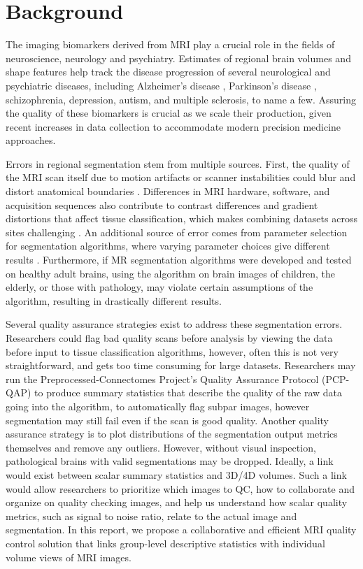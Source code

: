 \section{Background}


The imaging biomarkers derived from MRI play a crucial role in the fields of neuroscience, neurology and psychiatry. Estimates of regional brain volumes and shape features help track the disease progression of several neurological and psychiatric diseases, including Alzheimer's disease \cite{Vemuri_2010}, Parkinson's disease \cite{Silvia_Mangia_2013}, schizophrenia\cite{shenton2001review}, depression\cite{meisenzahl2011structural}, autism\cite{brambilla2003brain}, and multiple sclerosis\cite{Filippi_1995}, to name a few. Assuring the quality of these biomarkers is crucial as we scale their production, given recent increases in data collection to accommodate modern precision medicine approaches. 

Errors in regional segmentation stem from multiple sources. First, the quality of the MRI scan itself due to motion artifacts or scanner instabilities could blur and distort anatomical boundaries \cite{Blumenthal_2002}. Differences in MRI hardware, software, and acquisition sequences also contribute to contrast differences and gradient distortions that affect tissue classification, which makes combining datasets across sites challenging \cite{keshavan2016power}. An additional source of error comes from parameter selection for segmentation algorithms, where varying parameter choices give different results \cite{Han_2006}. Furthermore, if MR segmentation algorithms were developed and tested on healthy adult brains, using the algorithm on brain images of children, the elderly, or those with pathology, may violate certain assumptions of the algorithm, resulting in drastically different results. 

Several quality assurance strategies exist to address these segmentation errors. Researchers could flag bad quality scans before analysis by viewing the data before input to tissue classification algorithms, however, often this is not very straightforward, and gets too time consuming for large datasets. Researchers may run the Preprocessed-Connectomes Project’s Quality Assurance Protocol (PCP-QAP)\cite{shehzadpreprocessed} to produce summary statistics that describe the quality of the raw data going into the algorithm, to automatically flag subpar images, however segmentation may still fail even if the scan is good quality. Another quality assurance strategy is to plot distributions of the segmentation output metrics themselves and remove any outliers. However, without visual inspection, pathological brains with valid segmentations may be dropped. Ideally, a link would exist between scalar summary statistics and 3D/4D volumes. Such a link would allow researchers to prioritize which images to QC, how to collaborate and organize on quality checking images, and help us understand how scalar quality metrics, such as signal to noise ratio, relate to the actual image and segmentation. In this report, we propose a collaborative and efficient MRI quality control solution that links group-level descriptive statistics with individual volume views of MRI images.  

